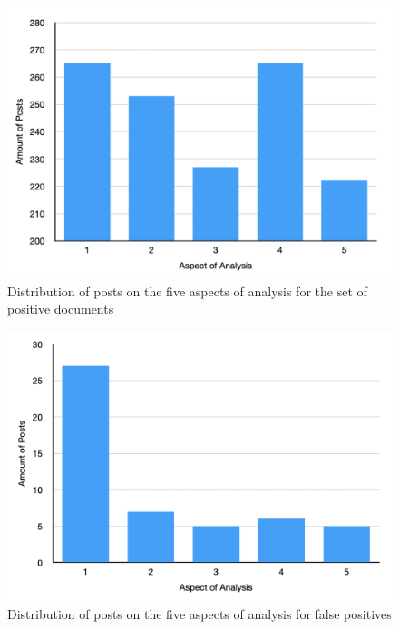 \documentclass[english,bachelor]{swsLeipzig}
\begin{document}
\begin{figure}[h]
  \centering
  \includegraphics[width=1\textwidth]{images/table_setB.png}
  \caption{Distribution of posts on the five aspects of analysis for the set of positive documents}
  \label{fig:appendix4}
\end{figure}

\begin{figure}[h]
  \centering
  \includegraphics[width=1\textwidth]{images/table_setC.png}
  \caption{Distribution of posts on the five aspects of analysis for false positives}
  \label{fig:appendix5}
\end{figure}

\end{document}
